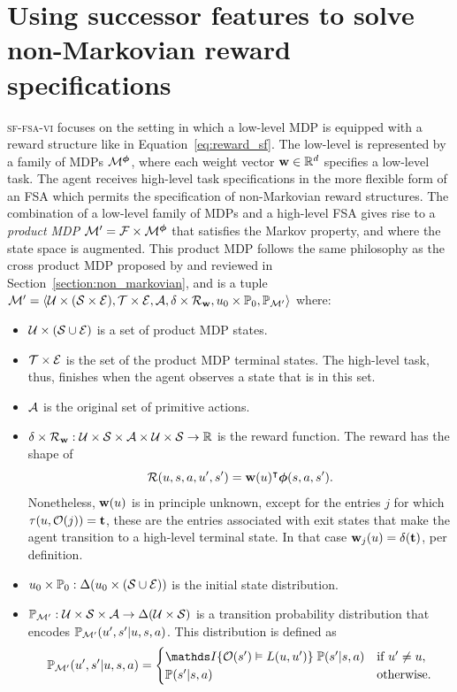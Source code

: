 \section{Using successor features to solve non-Markovian reward specifications}

\textsc{sf-fsa-vi} focuses on the setting in which a low-level MDP is equipped with a reward structure like in Equation~\eqref{eq:reward_sf}. The low-level is represented by a family of MDPs $\mathcal{M}^{\boldsymbol{\phi}}$, where each weight vector $\mathbf{w}\in\mathbb{R}^d$ specifies a low-level task. The agent receives high-level task specifications in the more flexible form of an FSA which permits the specification of non-Markovian reward structures. The combination of a low-level family of MDPs and a high-level FSA gives rise to a \textit{product MDP} $\mathcal{M}'=\mathcal{F}\times\mathcal{M}^{\boldsymbol{\phi}}$ that satisfies the Markov property, and where the state space is augmented. This product MDP follows the same philosophy as the cross product MDP proposed by \citet{Icarte2022} and reviewed in Section~\ref{section:non_markovian}, and is a tuple$\mathcal{M}'=\langle\mathcal{U}\times(\mathcal{S}\times\mathcal{E}), \mathcal{T}\times\mathcal{E}, \mathcal{A}, \delta\times\mathcal{R}_{\mathbf{w}},u_0\times\mathbb{P}_0, \mathbb{P}_{\mathcal{M}'} \rangle$ where:
\begin{itemize}
  \item $\mathcal{U}\times(\mathcal{S}\cup\mathcal{E})$ is a set of product MDP states.
  \item $\mathcal{T}\times\mathcal{E}$ is the set of the product MDP terminal states. The high-level task, thus, finishes when the agent observes a state that is in this set.
  \item $\mathcal{A}$ is the original set of primitive actions.
  \item $\delta\times\mathcal{R}_{\mathbf{w}}:\mathcal{U}\times\mathcal{S}\times\mathcal{A}\times\mathcal{U}\times\mathcal{S}\rightarrow\mathbb{R}$ is the reward function. The reward has the shape of\begin{equation*}
    \mathcal{R}(u, s, a, u', s') = \mathbf{w}(u)^\intercal\boldsymbol{\phi}(s, a, s').
  \end{equation*}
  Nonetheless, $\mathbf{w}(u)$ is in principle unknown, except for the entries $j$ for which $\tau(u,\mathcal{O}(j))=\textbf{t}$, these are the entries associated with exit states that make the agent transition to a high-level terminal state. In that case $\mathbf{w}_j(u)=\delta(\textbf{t})$, per definition.
  \item $u_0\times\mathbb{P}_0:\Delta(u_0\times(\mathcal{S}\cup\mathcal{E}))$ is the initial state distribution.
  \item $\mathbb{P}_{\mathcal{M}'}:\mathcal{U}\times\mathcal{S}\times\mathcal{A}\rightarrow\Delta(\mathcal{U}\times\mathcal{S})$ is a transition probability distribution that encodes $\mathbb{P}_{\mathcal{M}'}(u',s'\lvert u,s,a)$. This distribution is defined as
  \begin{equation*}
    \kernel_{\cM'}(u',s'\lvert u,s,a) =
       \begin{cases}
         \indicator{\cO(s')\vDash L(u, u')}\;\kernel(s' \lvert s, a) & \text{if $u'\neq u$},\\
         \kernel(s' \lvert s, a) & \text{otherwise}.
       \end{cases}       
   \end{equation*}
  

  

\end{itemize}
